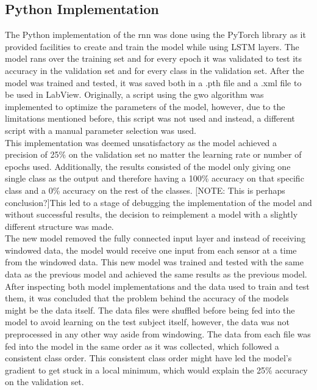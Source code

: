 \subsection{Python Implementation}
The Python implementation of the \acrshort{rnn} was done using the PyTorch library as it provided facilities 
to create and train the model while using LSTM layers. The model rans over the training set and for every epoch
it was validated to test its accuracy in the validation set and for every class in the validation set. After the model was trained 
and tested, it was saved both in a .pth file and a .xml file to be used in LabView.
Originally, a script using the \acrshort{gwo} algorithm was implemented 
to optimize the parameters of the model, however, due to the limitations mentioned before, this script was not 
used and instead, a different script with a manual parameter selection was used.
\\
[NOTE: This is results:]This implementation was deemed unsatisfactory as the model achieved a precision of 25\% on the validation set no matter the
learning rate or number of epochs used. Additionally, the results consisted of the model only giving one single class as the output
and therefore having a 100\% accuracy on that specific class and a 0\% accuracy on the rest of the classes. 
[NOTE: This is perhaps conclusion?]This led to a stage of debugging the implementation of the model and without successful results, the decision to reimplement 
a model with a slightly different structure was made.
\\
[NOTE: Rewrite into the first results]The new model removed the fully connected input layer and instead of receiving windowed data, the model would receive one input
from each sensor at a time from the windowed data. This new model was trained and tested with the same data as the previous model 
and achieved the same results as the previous model.
\\
[NOTE: This is Conclusion]After inspecting both model implementations and the data used to train and test them, it was concluded that the problem behind the accuracy
of the models might be the data itself. The data files were shuffled before being fed into the model to avoid learning on the test subject
itself, however, the data was not preprocessed in any other way aside from windowing. The data from each file was fed into the model in the 
same order as it was collected, which followed a consistent class order. This consistent class order might have led the model's gradient to 
get stuck in a local minimum, which would explain the 25\% accuracy on the validation set.

